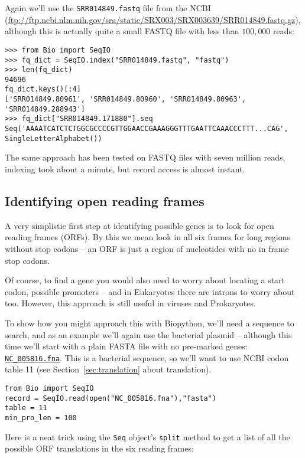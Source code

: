 \documentclass{report}
\begin{document}
Again we'll use the \texttt{SRR014849.fastq} file from the NCBI
(\url{ftp://ftp.ncbi.nlm.nih.gov/sra/static/SRX003/SRX003639/SRR014849.fastq.gz}),
although this is actually quite a small FASTQ file with less than $100,000$ reads:

\begin{verbatim}
>>> from Bio import SeqIO
>>> fq_dict = SeqIO.index("SRR014849.fastq", "fastq")
>>> len(fq_dict)
94696
fq_dict.keys()[:4]
['SRR014849.80961', 'SRR014849.80960', 'SRR014849.80963', 'SRR014849.288943']
>>> fq_dict["SRR014849.171880"].seq
Seq('AAAATCATCTCTGGCGCCCCGTTGGAACCGAAAGGGTTTGAATTCAAACCCTTT...CAG', SingleLetterAlphabet())
\end{verbatim}

The same approach has been tested on FASTQ files with seven million reads,
indexing took about a minute, but record access is almost instant.

\subsection{Identifying open reading frames}

A very simplistic first step at identifying possible genes is to look for
open reading frames (ORFs).  By this we mean look in all six frames for long
regions without stop codons -- an ORF is just a region of nucleotides with
no in frame stop codons.

Of course, to find a gene you would also need to worry about locating a start
codon, possible promoters -- and in Eukaryotes there are introns to worry about
too.  However, this approach is still useful in viruses and Prokaryotes.

To show how you might approach this with Biopython, we'll need a sequence to
search, and as an example we'll again use the bacterial plasmid -- although
this time we'll start with a plain FASTA file with no pre-marked genes:
\href{http://biopython.org/SRC/biopython/Tests/GenBank/NC_005816.fna}
{\texttt{NC\_005816.fna}}. This is a bacterial sequence, so we'll want to use
NCBI codon table 11 (see Section~\ref{sec:translation} about translation).

\begin{verbatim}
from Bio import SeqIO 
record = SeqIO.read(open("NC_005816.fna"),"fasta")
table = 11
min_pro_len = 100
\end{verbatim}

Here is a neat trick using the \verb|Seq| object's \verb|split| method to
get a list of all the possible ORF translations in the six reading frames:
\end{document}
